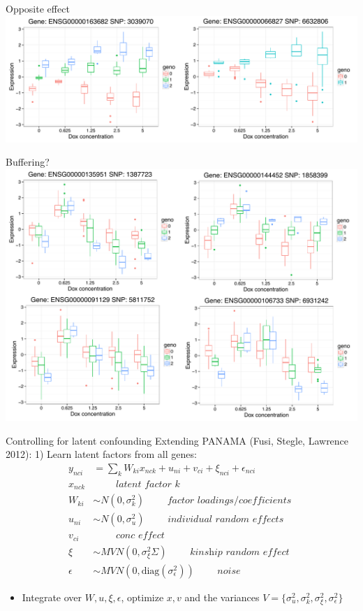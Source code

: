 \documentclass{beamer}
\begin{document}
\begin{frame}{Opposite effect}
\centering
\includegraphics[width=\textwidth,clip,trim=0 0 0 0]{../figures/iqtl_types/opposite_effect.pdf}
\end{frame}

\begin{frame}{Buffering?}
\centering
\includegraphics[width=\textwidth,clip,trim=0 0 0 0]{../figures/iqtl_types/buffering.pdf}
\end{frame}

\begin{frame}{Controlling for latent confounding}
Extending PANAMA (Fusi, Stegle, Lawrence 2012): 
1) Learn latent factors from all genes:
\begin{align*}
y_{nci} &= \sum_k W_{ki} x_{nck} + u_{ni} + v_{ci} + \xi_{nci} + \epsilon_{nci} \\
x_{nck} & \qquad \textit{ latent factor $k$ } \\
W_{ki} & \sim N(0, \sigma^2_k ) \qquad \textit{ factor loadings/coefficients } \\ 
u_{ni} &\sim N(0, \sigma^2_u) \qquad \textit{ individual random effects } \\
v_{ci} & \qquad \textit{ conc effect } \\
\xi &\sim MVN(0, \sigma^2_\xi \Sigma ) \qquad \textit{ kinship random effect }  \\
\epsilon &\sim MVN(0, \text{diag}(\sigma^2_\epsilon)) \qquad \textit{ noise } 
\end{align*}
\begin{itemize}
\item Integrate over $W, u, \xi, \epsilon$, optimize $x,v$ and the variances $V=\{ \sigma^2_u, \sigma^2_k,  \sigma^2_\xi, \sigma^2_\epsilon \}$
\end{itemize}
\end{frame}
\end{document}
